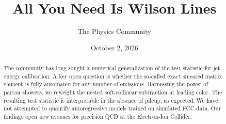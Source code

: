 \documentclass[11pt]{article}
\title{All You Need Is Wilson Lines}
\author{The Physics Community}
\date{October 2, 2026}
\numberwithin{equation}{section}
\theoremstyle{definition}
\theoremstyle{remark}
\begin{document}
\maketitle
\begin{abstract}
The community has long sought a numerical generalization of the test
statistic for jet energy calibration. A key open question is whether the
so-called exact smeared matrix element is fully automated for any number
of emissions. Harnessing the power of parton showers, we reweight the
nested soft-collinear subtraction at leading color. The resulting test
statistic is interpretable in the absence of pileup, as expected. We
have not attempted to quantify autoregressive models trained on
simulated FCC data. Our findings open new avenues for precision QCD at
the Electron-Ion Collider.
\end{abstract}
\tableofcontents



\nocite{*}


\end{document}

